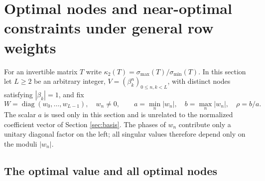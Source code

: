 \documentclass[10pt,twoside,final]{siamart1116}
\numberwithin{equation}{section}
\numberwithin{theorem}{section}
\newcommand{\diag}{\operatorname{diag}}
\newcommand{\cond}{\kappa_2}
\begin{document}
\section{Optimal nodes and near-optimal constraints under general row weights}
\label{sec:weighted}

For an invertible matrix $T$ write $\cond(T)=\sigma_{\max}(T)/\sigma_{\min}(T)$. In this
section let $L\ge2$ be an arbitrary integer, $V=(\beta_k^n)_{0\le n,k<L}$, with distinct
nodes satisfying $|\beta_k|=1$, and fix
\[
W=\diag(w_0,\ldots,w_{L-1}),\quad w_n\ne0,\qquad
a=\min_n|w_n|,\quad b=\max_n|w_n|,\quad \rho=b/a.
\]
The scalar $a$ is used only in this section and is unrelated to the normalized
coefficient vector of Section \ref{sec:basis}.
The phases of $w_n$ contribute only a unitary diagonal factor on the left;
all singular values therefore depend only on the moduli $|w_n|$.

\subsection{The optimal value and all optimal nodes}
\end{document}
